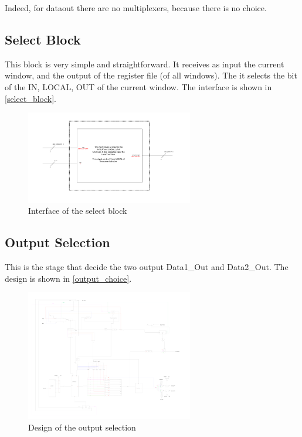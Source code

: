Indeed, for dataout there are no multiplexers, because there is no choice. 

\subsection{Select Block}

This block is very simple and straightforward. It receives as input the current window, and the output of the register file (of all windows). The it selects the bit of the IN, LOCAL, OUT of the current window. The interface is shown in \autoref{select_block}.

\begin{figure}[ht]
  \centering
  \includegraphics[width=0.65\textwidth]{chapters/4_DecodeStage/images/select_block.pdf}
  \caption{Interface of the select block}
  \label{select_block}
\end{figure}

\subsection{Output Selection}
This is the stage that decide the two output Data1\_Out and Data2\_Out. The design is shown in \autoref{output_choice}.

\begin{figure}[H]
  \centering
  \includegraphics[width=0.65\textwidth]{chapters/4_DecodeStage/images/output_choice.pdf}
  \caption{Design of the output selection}
  \label{output_choice}
\end{figure}

